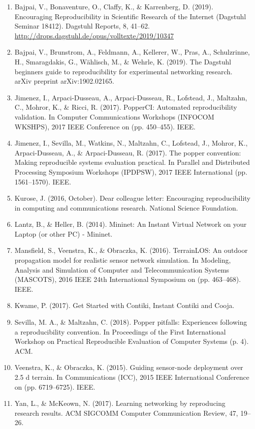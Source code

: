 \documentclass{article}
\begin{document}
\begin{enumerate}
    \item Bajpai, V., Bonaventure, O., Claffy, K., \& Karrenberg, D. (2019). Encouraging Reproducibility in Scientific Research of the Internet (Dagstuhl Seminar 18412). Dagstuhl Reports, 8, 41–62. \url{http://drops.dagstuhl.de/opus/volltexte/2019/10347}
    \item Bajpai, V., Brunstrom, A., Feldmann, A., Kellerer, W., Pras, A., Schulzrinne, H., Smaragdakis, G., Wählisch, M., \& Wehrle, K. (2019). The Dagstuhl beginners guide to reproducibility for experimental networking research. arXiv preprint arXiv:1902.02165.
    \item Jimenez, I., Arpaci-Dusseau, A., Arpaci-Dusseau, R., Lofstead, J., Maltzahn, C., Mohror, K., \& Ricci, R. (2017). PopperCI: Automated reproducibility validation. In Computer Communications Workshops (INFOCOM WKSHPS), 2017 IEEE Conference on (pp. 450–455). IEEE.
    \item Jimenez, I., Sevilla, M., Watkins, N., Maltzahn, C., Lofstead, J., Mohror, K., Arpaci-Dusseau, A., \& Arpaci-Dusseau, R. (2017). The popper convention: Making reproducible systems evaluation practical. In Parallel and Distributed Processing Symposium Workshops (IPDPSW), 2017 IEEE International (pp. 1561–1570). IEEE.
    \item Kurose, J. (2016, October). Dear colleague letter: Encouraging reproducibility in computing and communications research. National Science Foundation.
    \item Lantz, B., \& Heller, B. (2014). Mininet: An Instant Virtual Network on your Laptop (or other PC) - Mininet.
    \item Mansfield, S., Veenstra, K., \& Obraczka, K. (2016). TerrainLOS: An outdoor propagation model for realistic sensor network simulation. In Modeling, Analysis and Simulation of Computer and Telecommunication Systems (MASCOTS), 2016 IEEE 24th International Symposium on (pp. 463–468). IEEE.
    \item Kwame, P. (2017). Get Started with Contiki, Instant Contiki and Cooja.
    \item Sevilla, M. A., \& Maltzahn, C. (2018). Popper pitfalls: Experiences following a reproducibility convention. In Proceedings of the First International Workshop on Practical Reproducible Evaluation of Computer Systems (p. 4). ACM.
    \item Veenstra, K., \& Obraczka, K. (2015). Guiding sensor-node deployment over 2.5 d terrain. In Communications (ICC), 2015 IEEE International Conference on (pp. 6719–6725). IEEE.
    \item Yan, L., \& McKeown, N. (2017). Learning networking by reproducing research results. ACM SIGCOMM Computer Communication Review, 47, 19–26.
\end{enumerate}
\end{document}
